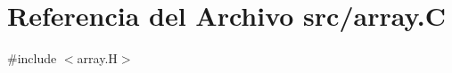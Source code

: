 \hypertarget{array_8_c}{}\section{Referencia del Archivo src/array.C}
\label{array_8_c}
{\ttfamily \#include $<$array.\+H$>$}\newline
